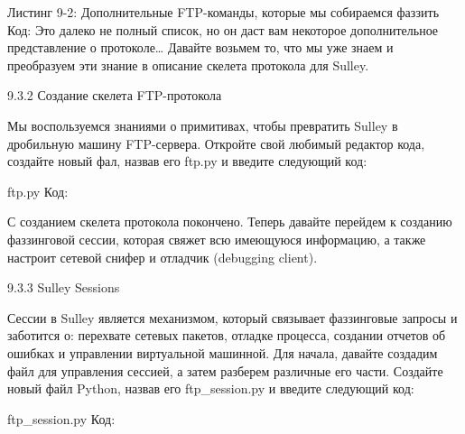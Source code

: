 \documentclass[12pt, a4paper, oneside]{book}
\begin{document}
Листинг 9-2: Дополнительные FTP-команды, которые мы собираемся фаззить
Код:
Это далеко не полный список, но он даст вам некоторое дополнительное представление о протоколе… Давайте возьмем то, что мы уже знаем и преобразуем эти знание в описание скелета протокола для Sulley.

9.3.2 Создание скелета FTP-протокола

Мы воспользуемся знаниями о примитивах, чтобы превратить Sulley в дробильную машину FTP-сервера. Откройте свой любимый редактор кода, создайте новый фал, назвав его ftp.py и введите следующий код:

ftp.py
Код:






С созданием скелета протокола покончено. Теперь давайте перейдем к созданию фаззинговой сессии, которая свяжет всю имеющуюся информацию, а также настроит сетевой снифер и отладчик (debugging client). 

9.3.3 Sulley Sessions

Сессии в Sulley является механизмом, который связывает фаззинговые запросы и заботится о: перехвате сетевых пакетов, отладке процесса, создании отчетов об ошибках и управлении виртуальной машинной. Для начала, давайте создадим файл для управления сессией, а затем разберем различные его части. Создайте новый файл Python, назвав его ftp\_session.py и введите следующий код:

ftp\_session.py
Код:
\end{document}
